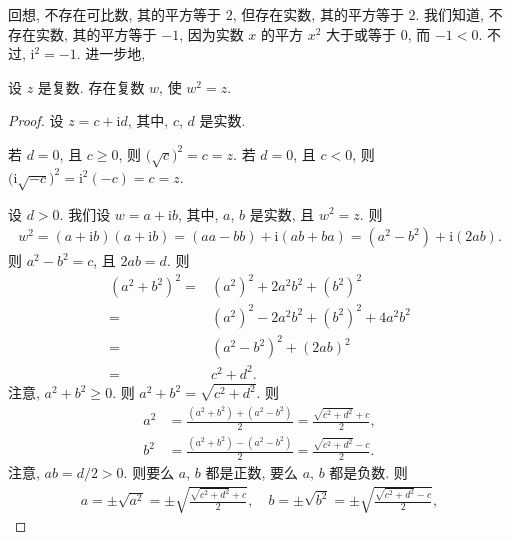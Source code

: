 \documentclass[../libro.tex]{subfiles}
\begin{document}
回想, 不存在可比数, 其的平方等于 \(2\),
但存在实数, 其的平方等于 \(2\).
我们知道, 不存在实数, 其的平方等于 \(-1\),
因为实数 \(x\) 的平方 \(x^2\) 大于或等于 \(0\),
而 \(-1 < 0\).
不过, \(\mathrm{i}^2 = -1\).
进一步地,

\begin{theorem}
    设 \(z\) 是复数.
    存在复数 \(w\), 使 \(w^2 = z\).
\end{theorem}

\begin{proof}
    设 \(z = c + \mathrm{i} d\),
    其中, \(c\), \(d\) 是实数.

    若 \(d = 0\), 且 \(c \geq 0\),
    则 \(\big( \sqrt{c} \big)^2 = c = z\).
    若 \(d = 0\), 且 \(c < 0\),
    则 \(\big( \mathrm{i} \sqrt{-c} \big)^2
    = \mathrm{i}^2 (-c) = c = z\).

    设 \(d > 0\).
    我们设 \(w = a + \mathrm{i} b\),
    其中, \(a\), \(b\) 是实数,
    且 \(w^2 = z\).
    则
    \begin{align*}
        w^2
        = (a + \mathrm{i} b) (a + \mathrm{i} b)
        = (a a - b b) + \mathrm{i} (a b + b a)
        = (a^2 - b^2) + \mathrm{i} (2 a b).
    \end{align*}
    则 \(a^2 - b^2 = c\), 且 \(2 a b = d\).
    则
    \begin{align*}
        (a^2 + b^2)^2
        = {} &
        (a^2)^2 + 2 a^2 b^2 + (b^2)^2
        \\
        = {} &
        (a^2)^2 - 2 a^2 b^2 + (b^2)^2 + 4 a^2 b^2
        \\
        = {} &
        (a^2 - b^2)^2 + (2 a b)^2
        \\
        = {} &
        c^2 + d^2.
    \end{align*}
    注意, \(a^2 + b^2 \geq 0\).
    则 \(a^2 + b^2 = \sqrt{c^2 + d^2}\).
    则
    \begin{align*}
        a^2 & =
        \frac{(a^2 + b^2) + (a^2 - b^2)}{2}
        = \frac{\sqrt{c^2 + d^2} + c}{2},
        \\
        b^2 & =
        \frac{(a^2 + b^2) - (a^2 - b^2)}{2}
        = \frac{\sqrt{c^2 + d^2} - c}{2}.
    \end{align*}
    注意, \(a b = d/2 > 0\).
    则要么 \(a\), \(b\) 都是正数,
    要么 \(a\), \(b\) 都是负数.
    则
    \begin{align*}
        a
        = \pm \sqrt{a^2}
        = \pm \sqrt{\frac{\sqrt{c^2 + d^2} + c}{2}},
        \quad
        b
        = \pm \sqrt{b^2}
        = \pm \sqrt{\frac{\sqrt{c^2 + d^2} - c}{2}},
    \end{align*}

\end{proof}
\end{document}
